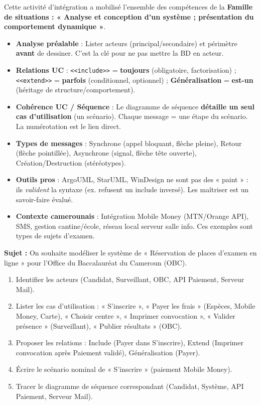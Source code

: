 \documentclass[11pt]{article}
\newcounter{popsec}
\newcounter{popsub}
\newcommand{\courssub}[1]{%
  \stepcounter{popsub}%
  \par\vspace{9pt}\noindent{\popxbold\fontsize{11.5}{13}\selectfont\color{popink}{\color{poporange}\thepopsec.\thepopsub}\hspace{6pt}#1}\par\nopagebreak\vspace{4pt}
}
\begin{document}
\courssub{Bilan et transfert vers l'examen}

Cette activité d'intégration a mobilisé l'ensemble des compétences de la \textbf{Famille de situations : « Analyse et conception d'un système ; présentation du comportement dynamique »}.

\begin{aretenir}
\begin{itemize}
  \item \textbf{Analyse préalable} : Lister acteurs (principal/secondaire) et périmètre \textbf{avant} de dessiner. C'est la clé pour ne pas mettre la BD en acteur.
  \item \textbf{Relations UC} : \texttt{<<include>>} = \textbf{toujours} (obligatoire, factorisation) ; \texttt{<<extend>>} = \textbf{parfois} (conditionnel, optionnel) ; \textbf{Généralisation} = \textbf{est-un} (héritage de structure/comportement).
  \item \textbf{Cohérence UC / Séquence} : Le diagramme de séquence \textbf{détaille un seul cas d'utilisation} (un scénario). Chaque message = une étape du scénario. La numérotation est le lien direct.
  \item \textbf{Types de messages} : Synchrone (appel bloquant, flèche pleine), Retour (flèche pointillée), Asynchrone (signal, flèche tête ouverte), Création/Destruction (stéréotypes).
  \item \textbf{Outils pros} : ArgoUML, StarUML, WinDesign ne sont pas des « paint » : ils \emph{valident} la syntaxe (ex. refusent un include inversé). Les maîtriser est un savoir-faire évalué.
  \item \textbf{Contexte camerounais} : Intégration Mobile Money (MTN/Orange API), SMS, gestion cantine/école, réseau local serveur salle info. Ces exemples sont types de sujets d'examen.
\end{itemize}
\end{aretenir}

\begin{exercice}
\textbf{Sujet :} On souhaite modéliser le système de « Réservation de places d'examen en ligne » pour l'Office du Baccalauréat du Cameroun (OBC).
\begin{enumerate}
  \item Identifier les acteurs (Candidat, Surveillant, OBC, API Paiement, Serveur Mail).
  \item Lister les cas d'utilisation : « S'inscrire », « Payer les frais » (Espèces, Mobile Money, Carte), « Choisir centre », « Imprimer convocation », « Valider présence » (Surveillant), « Publier résultats » (OBC).
  \item Proposer les relations : Include (Payer dans S'inscrire), Extend (Imprimer convocation après Paiement validé), Généralisation (Payer).
  \item Écrire le scénario nominal de « S'inscrire » (paiement Mobile Money).
  \item Tracer le diagramme de séquence correspondant (Candidat, Système, API Paiement, Serveur Mail).
\end{enumerate}
\end{exercice}
\end{document}
